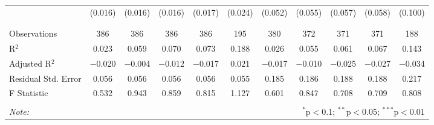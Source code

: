 \begin{table}[H]
\begin{tabular}{@{\extracolsep{4pt}}lcccccccccc}
  & (0.016) & (0.016) & (0.016) & (0.017) & (0.024) & (0.052) & (0.055) & (0.057) & (0.058) & (0.100) \\ 
  & & & & & & & & & & \\ 
\hline \\[-1.8ex] 
Observations & 386 & 386 & 386 & 386 & 195 & 380 & 372 & 371 & 371 & 188 \\ 
R$^{2}$ & 0.023 & 0.059 & 0.070 & 0.073 & 0.188 & 0.026 & 0.055 & 0.061 & 0.067 & 0.143 \\ 
Adjusted R$^{2}$ & $-$0.020 & $-$0.004 & $-$0.012 & $-$0.017 & 0.021 & $-$0.017 & $-$0.010 & $-$0.025 & $-$0.027 & $-$0.034 \\ 
Residual Std. Error & 0.056 & 0.056 & 0.056 & 0.056 & 0.055 & 0.185 & 0.186 & 0.188 & 0.188 & 0.217 \\ 
F Statistic & 0.532 & 0.943 & 0.859 & 0.815 & 1.127 & 0.601 & 0.847 & 0.708 & 0.709 & 0.808 \\ 
\hline 
\hline \\[-1.8ex] 
\textit{Note:}  & \multicolumn{10}{r}{$^{*}$p$<$0.1; $^{**}$p$<$0.05; $^{***}$p$<$0.01} \\ 
\end{tabular} 
\end{table} 
